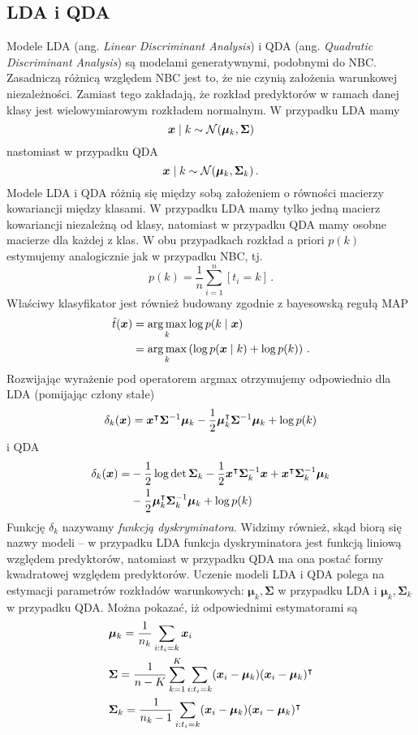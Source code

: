 \documentclass{myclass}
\begin{document}
\subsection{LDA i QDA}

Modele LDA (ang. \emph{Linear Discriminant Analysis}) i QDA (ang. \emph{Quadratic Discriminant
Analysis}) są modelami generatywnymi, podobnymi do NBC. Zasadniczą różnicą względem NBC jest to, że
nie czynią założenia warunkowej niezależności. Zamiast tego zakładają, że rozkład predyktorów w
ramach danej klasy jest wielowymiarowym rozkładem normalnym. W przypadku LDA mamy
\[
    \bm{x} \mid k \sim \mathcal{N}(\bm{\mu}_k, \bm{\Sigma})
\]
nastomiast w przypadku QDA
\[
    \bm{x} \mid k \sim \mathcal{N}(\bm{\mu}_k, \bm{\Sigma}_k)\,.
\]
Modele LDA i QDA różnią się między sobą założeniem o równości macierzy kowariancji między klasami. W
przypadku LDA mamy tylko jedną macierz kowariancji niezależną od klasy, natomiast w przypadku QDA
mamy osobne macierze dla każdej z klas. W obu przypadkach rozkład a priori $p(k)$ estymujemy
analogicznie jak w przypadku NBC, tj.
\[
     p(k) = \frac{1}{n} \sum_{i=1}^n [t_i = k]\,.
\]
Właściwy klasyfikator jest również budowany zgodnie z bayesowską regułą MAP
\[
\begin{split}
    \hat{t}(\bm{x}) &= \operatorname*{arg\,max}_{k} \log p(k \mid \bm{x}) \\
                    &= \operatorname*{arg\,max}_{k} \left( \log p(\bm{x} \mid k) + \log p(k)\right)\,.
\end{split}
\]
Rozwijając wyrażenie pod operatorem argmax otrzymujemy odpowiednio dla LDA (pomijając człony stałe)
\[
    \delta_k(\bm{x}) = \bm{x}^\intercal \bm{\Sigma}^{-1}\bm{\mu}_k - \frac{1}{2} \bm{\mu}_k^\intercal \bm{\Sigma}^{-1} \bm{\mu}_k + \log p(k)
\]
i QDA
\[
\begin{split}
    \delta_k(\bm{x}) = &-\frac{1}{2} \log \det \bm{\Sigma}_k - \frac{1}{2} \bm{x}^\intercal \bm{\Sigma}_k^{-1} \bm{x} + \bm{x}^\intercal \bm{\Sigma}_k^{-1} \bm{\mu}_k \\
                       &- \frac{1}{2} \bm{\mu}_k^\intercal \bm{\Sigma}_k^{-1} \bm{\mu}_k + \log p(k)
\end{split}
\]
Funkcję $\delta_k$ nazywamy \emph{funkcją dyskryminatora}. Widzimy również, skąd biorą się nazwy
modeli -- w przypadku LDA funkcja dyskryminatora jest funkcją liniową względem predyktorów,
natomiast w przypadku QDA ma ona postać formy kwadratowej względem predyktorów. Uczenie modeli LDA i
QDA polega na estymacji parametrów rozkładów warunkowych: $\bm{\mu}_k, \bm{\Sigma}$ w przypadku LDA
i $\bm{\mu}_k, \bm{\Sigma}_k$ w przypadku QDA. Można pokazać, iż odpowiednimi estymatorami są
\[
\begin{split}
    &\bm{\mu}_k = \frac{1}{n_k} \sum_{i: t_i = k} \bm{x}_i\\
    &\bm{\Sigma} = \frac{1}{n - K} \sum_{k=1}^K \sum_{i: t_i = k} (\bm{x}_i - \bm{\mu}_k)(\bm{x}_i - \bm{\mu}_k)^\intercal\\
    &\bm{\Sigma}_k = \frac{1}{n_k - 1} \sum_{i: t_i = k} (\bm{x}_i - \bm{\mu}_k)(\bm{x}_i - \bm{\mu}_k)^\intercal
\end{split}
\]
\end{document}
